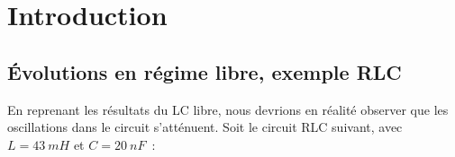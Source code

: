 \documentclass[../../main/main.tex]{subfiles}
\begin{document}
\begin{tcn}[%
		sidebyside, fontupper=\small, fontlower=\small
	]
\begin{tcn}[nsp]
	\end{tcn}
\end{tcn}

\vspace*{\fill}

\newpage

\section{Introduction}

\subsection{Évolutions en régime libre, exemple RLC}

\begin{minipage}{0.60\linewidth}
	En reprenant les résultats du LC libre, nous devrions en réalité observer que
	les oscillations dans le circuit s'atténuent. Soit le circuit RLC
	suivant, avec $L = \SI{43}{mH}$ et $C
		= \SI{20}{nF}$~:
\end{minipage}
\begin{minipage}{0.40\linewidth}
	\begin{center}
		\vspace{-15pt}
	\end{center}
\end{minipage}
\end{document}
